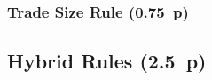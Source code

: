 




\subsubsection{Trade Size Rule (0.75~p)}\label{sec:trade-size-rule}







\subsection{Hybrid Rules (2.5~p)}\label{sec:hybrid-rules}

